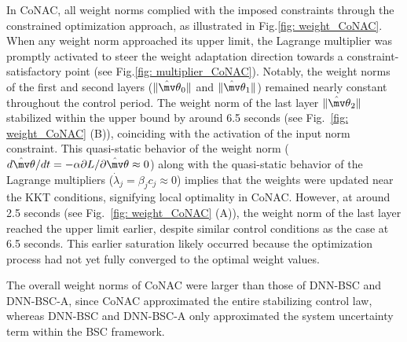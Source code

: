 \documentclass[lettersize,journal]{IEEEtran}
\newcommand*{\wth}{\mv\theta}
\begin{document}
In CoNAC, all weight norms complied with the imposed constraints through the constrained optimization approach, as illustrated in Fig.\ref{fig: weight_CoNAC}. When any weight norm approached its upper limit, the Lagrange multiplier was promptly activated to steer the weight adaptation direction towards a constraint-satisfactory point (see Fig.\ref{fig: multiplier_CoNAC}). Notably, the weight norms of the first and second layers ($\Vert {{{\hat \wth }_0}} \Vert$ and $\Vert {{{\hat \wth }_1}} \Vert$) remained nearly constant throughout the control period. The weight norm of the last layer $\Vert {{{\hat \wth }_2}} \Vert$ stabilized within the upper bound by around 6.5 seconds (see Fig.~\ref{fig: weight_CoNAC} (B)), coinciding with the activation of the input norm constraint. This quasi-static behavior of the weight norm (\ie $d{\hat\wth}/dt=-\alpha\partial L/\partial \hat\wth \approx 0$) along with the quasi-static behavior of the Lagrange multipliers (\ie $\dot\lambda_j = \beta_j c_j \approx 0$) implies that the weights were updated near the KKT conditions, signifying local optimality in CoNAC. However, at around 2.5 seconds (see Fig.~\ref{fig: weight_CoNAC} (A)), the weight norm of the last layer reached the upper limit earlier, despite similar control conditions as the case at 6.5 seconds. This earlier saturation likely occurred because the optimization process had not yet fully converged to the optimal weight values.

The overall weight norms of CoNAC were larger than those of DNN-BSC and DNN-BSC-A, since CoNAC approximated the entire stabilizing control law, whereas DNN-BSC and DNN-BSC-A only approximated the system uncertainty term within the BSC framework.



\end{document}

